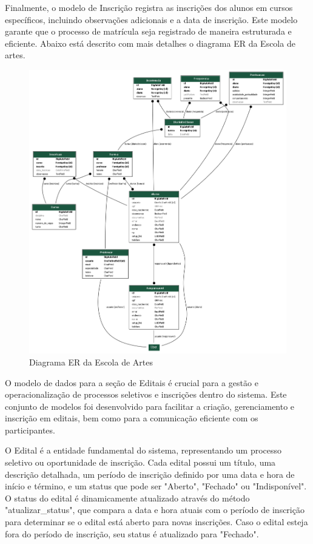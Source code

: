 Finalmente, o modelo de Inscrição registra as inscrições dos alunos em cursos específicos, incluindo observações adicionais e a data de inscrição. Este modelo garante que o processo de matrícula seja registrado de maneira estruturada e eficiente. Abaixo está descrito com mais detalhes o diagrama ER da Escola de artes.


\begin{figure}[htb]
	\centering
	 \begin{minipage}{0.4\textwidth}
	   \centering
	   \caption{Diagrama ER da Escola de Artes} \label{er_diagram_escola}
	   \includegraphics[scale=0.25]{./img/er_diagram_escola.png}
	 \end{minipage}
   \end{figure}


O modelo de dados para a seção de Editais é crucial para a gestão e operacionalização de processos seletivos e inscrições dentro do sistema. Este conjunto de modelos foi desenvolvido para facilitar a criação, gerenciamento e inscrição em editais, bem como para a comunicação eficiente com os participantes.

O Edital é a entidade fundamental do sistema, representando um processo seletivo ou oportunidade de inscrição. Cada edital possui um título, uma descrição detalhada, um período de inscrição definido por uma data e hora de início e término, e um status que pode ser "Aberto", "Fechado" ou "Indisponível". O status do edital é dinamicamente atualizado através do método "atualizar\_status", que compara a data e hora atuais com o período de inscrição para determinar se o edital está aberto para novas inscrições. Caso o edital esteja fora do período de inscrição, seu status é atualizado para "Fechado".

